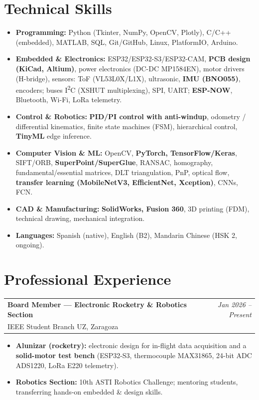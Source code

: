 \documentclass[10pt,a4paper]{article}
\makeatletter
\newcommand{\entry}[4]{%
  \noindent\begin{tabularx}{\textwidth}{@{}X r@{}}
    \textbf{#1} & \textit{\small #2}\\
    \textcolor{cvgray}{\small #3} & \textcolor{cvgray}{\small #4}\\
  \end{tabularx}\par\vspace{0.5pt}
}
\makeatother
\begin{document}
\section*{Technical Skills}
\begin{itemize}
  \item \textbf{Programming:} Python (Tkinter, NumPy, OpenCV, Plotly), C/C++ (embedded), MATLAB, SQL, Git/GitHub, Linux, PlatformIO, Arduino.
  \item \textbf{Embedded \& Electronics:} ESP32/ESP32-S3/ESP32-CAM, \textbf{PCB design (KiCad, Altium)}, power electronics (DC-DC MP1584EN), motor drivers (H-bridge), sensors: ToF (VL53L0X/L1X), ultrasonic, \textbf{IMU (BNO055)}, encoders; buses I\textsuperscript{2}C (XSHUT multiplexing), SPI, UART; \textbf{ESP-NOW}, Bluetooth, Wi-Fi, LoRa telemetry.
  \item \textbf{Control \& Robotics:} \textbf{PID/PI control with anti-windup}, odometry / differential kinematics, finite state machines (FSM), hierarchical control, \textbf{TinyML} edge inference.
  \item \textbf{Computer Vision \& ML:} OpenCV, \textbf{PyTorch, TensorFlow/Keras}, SIFT/ORB, \textbf{SuperPoint/SuperGlue}, RANSAC, homography, fundamental/essential matrices, DLT triangulation, PnP, optical flow, \textbf{transfer learning (MobileNetV3, EfficientNet, Xception)}, CNNs, FCN.
  \item \textbf{CAD \& Manufacturing:} \textbf{SolidWorks, Fusion 360}, 3D printing (FDM), technical drawing, mechanical integration.
  \item \textbf{Languages:} Spanish (native), English (B2), Mandarin Chinese (HSK 2, ongoing).
\end{itemize}

\section*{Professional Experience}
\entry{Board Member --- Electronic Rocketry \& Robotics Section}{Jan 2026 -- Present}
      {IEEE Student Branch UZ, Zaragoza}{}
\begin{itemize}
  \item \textbf{Alunizar (rocketry):} electronic design for in-flight data acquisition and a \textbf{solid-motor test bench} (ESP32-S3, thermocouple MAX31865, 24-bit ADC ADS1220, LoRa E220 telemetry).
  \item \textbf{Robotics Section:} 10th ASTI Robotics Challenge; mentoring students, transferring hands-on embedded \& design skills.
\end{itemize}
\end{document}
